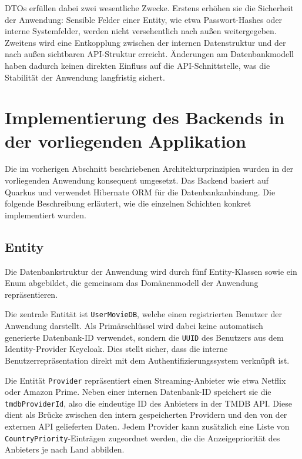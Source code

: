 DTOs erfüllen dabei zwei wesentliche Zwecke. Erstens erhöhen sie die Sicherheit der
Anwendung: Sensible Felder einer Entity, wie etwa Passwort-Hashes oder interne
Systemfelder, werden nicht versehentlich nach außen weitergegeben. Zweitens wird
eine Entkopplung zwischen der internen Datenstruktur und der nach außen sichtbaren
API-Struktur erreicht. Änderungen am Datenbankmodell haben dadurch keinen direkten
Einfluss auf die API-Schnittstelle, was die Stabilität der Anwendung langfristig
sichert.


\section{Implementierung des Backends in der vorliegenden Applikation}

Die im vorherigen Abschnitt beschriebenen Architekturprinzipien wurden in der
vorliegenden Anwendung konsequent umgesetzt. Das Backend basiert auf Quarkus und
verwendet Hibernate ORM für die Datenbankanbindung. Die folgende Beschreibung
erläutert, wie die einzelnen Schichten konkret implementiert wurden.

\subsection{Entity}

Die Datenbankstruktur der Anwendung wird durch fünf Entity-Klassen sowie ein
Enum abgebildet, die gemeinsam das Domänenmodell der Anwendung repräsentieren.

Die zentrale Entität ist \texttt{UserMovieDB}, welche einen registrierten Benutzer
der Anwendung darstellt. Als Primärschlüssel wird dabei keine automatisch generierte
Datenbank-ID verwendet, sondern die \texttt{UUID} des Benutzers aus dem
Identity-Provider Keycloak. Dies stellt sicher, dass die interne
Benutzerrepräsentation direkt mit dem Authentifizierungssystem verknüpft ist.

Die Entität \texttt{Provider} repräsentiert einen Streaming-Anbieter wie etwa
Netflix oder Amazon Prime. Neben einer internen Datenbank-ID speichert sie die
\texttt{tmdbProviderId}, also die eindeutige ID des Anbieters in der TMDB API.
Diese dient als Brücke zwischen den intern gespeicherten Providern und den von
der externen API gelieferten Daten. Jedem Provider kann zusätzlich eine Liste
von \texttt{CountryPriority}-Einträgen zugeordnet werden, die die Anzeigepriorität
des Anbieters je nach Land abbilden.

